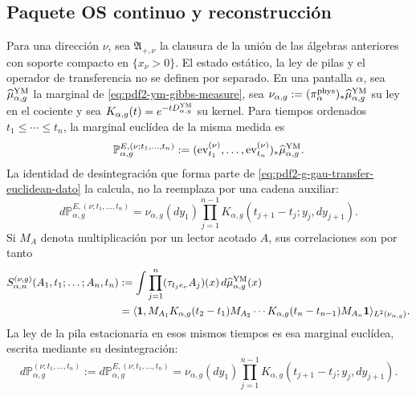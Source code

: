 \subsection{Paquete OS continuo y reconstrucción}

Para una dirección $\nu$, sea $\mathfrak A_{+,\nu}$ la clausura de la unión de
las álgebras anteriores con soporte compacto en $\{x_\nu>0\}$. El estado
estático, la ley de pilas y el operador de transferencia no se definen por
separado. En una pantalla $\alpha$, sea
$\widehat\mu_{\alpha,g}^{\rm YM}$ la marginal de
\eqref{eq:pdf2-ym-gibbs-measure}, sea
$\nu_{\alpha,g}:=(\pi_\alpha^{\rm phys})_*
\widehat\mu_{\alpha,g}^{\rm YM}$ su ley en el cociente y sea
$K_{\alpha,g}(t)=e^{-tD_{\alpha,g}^{\rm YM}}$ su kernel.
Para tiempos ordenados $t_1\le\cdots\le t_n$, la marginal euclídea de la
misma medida es
\begin{equation}\label{eq:pdf2-ym-owner-euclidean-time-marginal}
 \mathbb P_{\alpha,g}^{E,(\nu;t_1,\ldots,t_n)}
 :=(\operatorname{ev}_{t_1}^{(\nu)},\ldots,
    \operatorname{ev}_{t_n}^{(\nu)})_*
    \widehat\mu_{\alpha,g}^{\rm YM}.
\end{equation}
La identidad de desintegración que forma parte de
\eqref{eq:pdf2-g-gau-transfer-euclidean-dato} la calcula, no la reemplaza por
una cadena auxiliar:
\begin{equation}\label{eq:pdf2-ym-owner-euclidean-markov-identification}
 d\mathbb P_{\alpha,g}^{E,(\nu;t_1,\ldots,t_n)}
 =\nu_{\alpha,g}(dy_1)
   \prod_{j=1}^{n-1}K_{\alpha,g}
      (t_{j+1}-t_j;y_j,dy_{j+1}).
\end{equation}
Si $M_A$ denota multiplicación por un lector acotado $A$, sus correlaciones
son por tanto
\begin{equation}\label{eq:pdf2-ym-owner-schwinger-transfer}
 \begin{aligned}
 S_{\alpha,n}^{(\nu,g)}(A_1,t_1;\ldots;A_n,t_n)
 &:=\int\prod_{j=1}^n(\tau_{t_je_\nu}A_j)(x)\,
       d\widehat\mu_{\alpha,g}^{\rm YM}(x)\\
 &=\langle\mathbf1,
 M_{A_1}K_{\alpha,g}(t_2-t_1)M_{A_2}\cdots
 K_{\alpha,g}(t_n-t_{n-1})M_{A_n}\mathbf1
 \rangle_{L^2(\nu_{\alpha,g})}.
 \end{aligned}
\end{equation}
La ley de la pila estacionaria en esos mismos tiempos es esa marginal
euclídea, escrita mediante su desintegración:
\begin{equation}\label{eq:pdf2-ym-owner-markov-stack-law}
 d\mathbb P_{\alpha,g}^{(\nu;t_1,\ldots,t_n)}
 :=d\mathbb P_{\alpha,g}^{E,(\nu;t_1,\ldots,t_n)}
 =\nu_{\alpha,g}(dy_1)
   \prod_{j=1}^{n-1}K_{\alpha,g}(t_{j+1}-t_j;y_j,dy_{j+1}).
\end{equation}
